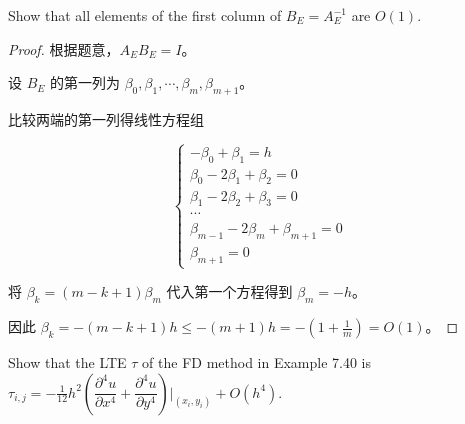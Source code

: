 \documentclass[lang=cn,a4paper,newtx,bibend=bibtex]{elegantpaper}
\begin{document}
\begin{prob}[Exercise 7.36]
  Show that all elements of the first column of $B_E = A_E^{-1}$ are $O(1)$.
\end{prob}

\begin{proof}
根据题意，$A_EB_E = I$。

设 $B_E$ 的第一列为 $\beta_0, \beta_1, \cdots, \beta_m, \beta_{m + 1}$。

比较两端的第一列得线性方程组

\[
\begin{cases}
  -\beta_0 + \beta_1 = h \\
  \beta_0 - 2\beta_1 + \beta_2 = 0 \\
  \beta_1 - 2\beta_2 + \beta_3  = 0 \\
  \cdots \\
  \beta_{m-1} - 2\beta_m + \beta_{m+1} = 0 \\
  \beta_{m + 1} = 0
\end{cases}
\]

将 $\beta_k = (m - k + 1) \beta_m$ 代入第一个方程得到 $\beta_m = -h$。

因此 $\beta_k = -(m - k + 1) h \le -(m + 1) h = -(1 + \frac1m) = O(1)$。
\end{proof}

\begin{prob}[Exercise 7.41]
  Show that the LTE $\tau$ of the FD method in 
  Example 7.40 is $\tau_{i, j} = -\frac{1}{12} h^2 \left(\dfrac{\partial^4 u}{\partial x^4} + 
  \dfrac{\partial^4 u}{\partial y^4}\right)\bigg|_{(x_i, y_i)} + O(h^4).$
\end{prob}
\end{document}
